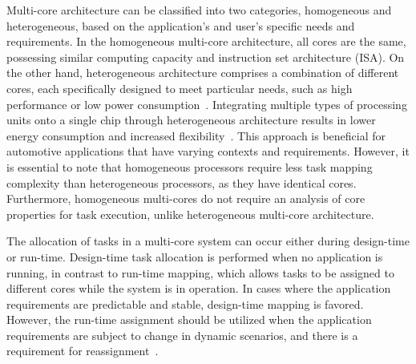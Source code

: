     Multi-core architecture can be classified into two categories, homogeneous and heterogeneous, based on the application's and user's specific needs and requirements. In the homogeneous multi-core architecture, all cores are the same, possessing similar computing capacity and instruction set architecture (ISA). On the other hand, heterogeneous architecture comprises a combination of different cores, each specifically designed to meet particular needs, such as high performance or low power consumption~\cite{gupta2021mapping}.
    Integrating multiple types of processing units onto a single chip through heterogeneous architecture results in lower energy consumption and increased flexibility~\cite{singh2013mapping}. This approach is beneficial for automotive applications that have varying contexts and requirements. However, it is essential to note that homogeneous processors require less task mapping complexity than heterogeneous processors, as they have identical cores. Furthermore, homogeneous multi-cores do not require an analysis of core properties for task execution, unlike heterogeneous multi-core architecture.

    The allocation of tasks in a multi-core system can occur either during design-time or run-time. Design-time task allocation is performed when no application is running, in contrast to run-time mapping, which allows tasks to be assigned to different cores while the system is in operation. In cases where the application requirements are predictable and stable, design-time mapping is favored. However, the run-time assignment should be utilized when the application requirements are subject to change in dynamic scenarios, and there is a requirement for reassignment~\cite{askaripoor2022architecture,askaripoor2023designer}.




